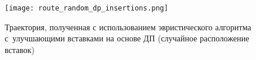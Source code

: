 \begin{figure}
  \begin{center}
  \texttt{[image: route\_random\_dp\_insertions.png]}
  \caption{
    Траектория, полученная с использованием эвристического алгоритма
    с~улучшающими вставками на основе ДП (случайное расположение вставок)}
  \label{DP_Random_Inserts_Result}
  \end{center}
\end{figure}
